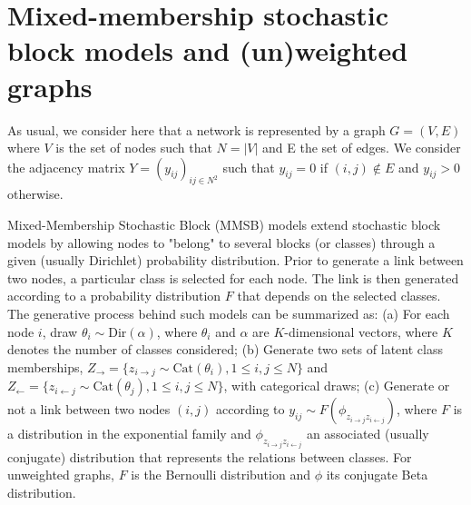 \section{Mixed-membership stochastic block models and (un)weighted graphs}

As usual, we consider here that a network is represented by a graph $G=(V,E)$ where $V$ is the set of nodes such that $N=|V|$ and E the set of edges. We consider the adjacency matrix $Y=(y_{ij})_{ij\in N^2}$ such that $y_{ij}=0$ if $(i,j) \notin E$ and $y_{ij} > 0$ otherwise.

Mixed-Membership Stochastic Block (MMSB) models extend stochastic block models \cite{airoldi2009mixed} by allowing nodes to "belong" to several blocks (or classes) through a given (usually Dirichlet) probability distribution. Prior to generate a link between two nodes, a particular class is selected for each node. The link is then generated according to a probability distribution $F$ that depends on the selected classes. The generative process behind such models can be summarized as: (a) For each node $i$, draw $\theta_i \sim \textrm{Dir}(\alpha)$, where $\theta_i$ and $\alpha$ are $K$-dimensional vectors, where $K$ denotes  the number of classes considered; (b) Generate two sets of latent class memberships, $Z_\rightarrow = \{z_{i\rightarrow j} \sim \textrm{Cat}(\theta_i),  1 \le i,j \le N\}$ and $Z_\leftarrow = \{z_{i\leftarrow j} \sim \textrm{Cat}(\theta_j),  1 \le i,j \le N\}$, with categorical draws; (c) Generate or not a link between two nodes $(i,j)$ according to $y_{ij} \sim F(\phi_{z_{i \rightarrow j}z_{i \leftarrow j}})$, where $F$ is a distribution in the exponential family and $\phi_{z_{i \rightarrow j}z_{i \leftarrow j}}$ an associated (usually conjugate) distribution that represents the relations between classes. For unweighted graphs, $F$ is the Bernoulli distribution and $\phi$ its conjugate Beta distribution.

